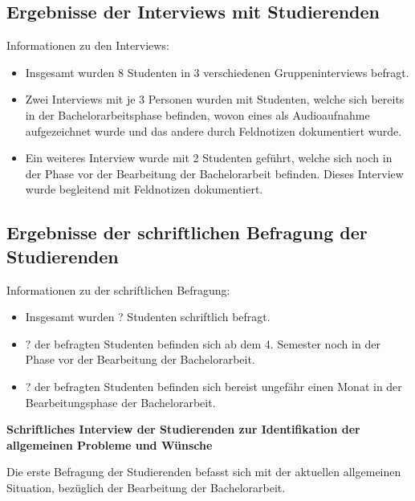 \documentclass{scrreprt}
\begin{document}
\subsection{Ergebnisse der Interviews mit Studierenden}
\par Informationen zu den Interviews:
\begin{itemize}
\item Insgesamt wurden 8 Studenten in 3 verschiedenen Gruppeninterviews befragt.
\item Zwei Interviews mit je 3 Personen wurden mit Studenten, welche sich bereits in der Bachelorarbeitsphase befinden, wovon eines als Audioaufnahme aufgezeichnet wurde und das andere durch Feldnotizen dokumentiert wurde.
\item Ein weiteres Interview wurde mit 2 Studenten geführt, welche sich noch in der Phase vor der Bearbeitung der Bachelorarbeit befinden. Dieses Interview wurde begleitend mit Feldnotizen dokumentiert.
\end{itemize}

\subsection{Ergebnisse der schriftlichen Befragung der Studierenden}
\par Informationen zu der schriftlichen Befragung:
\begin{itemize}
\item Insgesamt wurden ? Studenten schriftlich befragt.
\item ? der befragten Studenten befinden sich ab dem 4. Semester noch in der Phase vor der Bearbeitung der Bachelorarbeit.
\item ? der befragten Studenten befinden sich bereist ungefähr einen Monat in der Bearbeitungsphase der Bachelorarbeit.
\end{itemize}

\newpage
\par \textbf{Schriftliches Interview der Studierenden zur Identifikation der allgemeinen Probleme und Wünsche}
\par Die erste Befragung der Studierenden befasst sich mit der aktuellen allgemeinen Situation, bezüglich der Bearbeitung der Bachelorarbeit.\\
\end{document}
